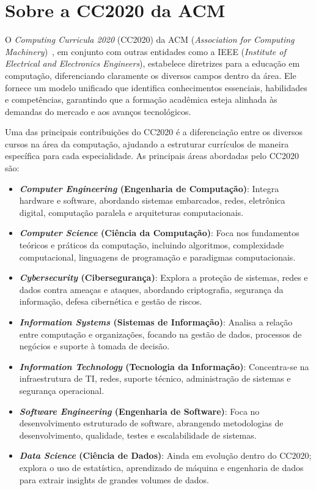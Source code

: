 \chapter{Sobre a CC2020 da ACM}
\label{chp:apresentacao_acm}

O \textit{Computing Curricula 2020} (CC2020) da ACM (\textit{Association for Computing Machinery})~\cite{ACM:CC2020}, em conjunto com outras entidades como a IEEE (\textit{Institute of Electrical and Electronics Engineers}), estabelece diretrizes para a educação em computação, diferenciando claramente os diversos campos dentro da área. Ele fornece um modelo unificado que identifica conhecimentos essenciais, habilidades e competências, garantindo que a formação acadêmica esteja alinhada às demandas do mercado e aos avanços tecnológicos.

Uma das principais contribuições do CC2020 é a diferenciação entre os diversos cursos na área da computação, ajudando a estruturar currículos de maneira específica para cada especialidade. As principais áreas abordadas pelo CC2020 são:

    \begin{itemize}
        \item \textbf{\textit{Computer Engineering} (Engenharia de Computação)}: Integra hardware e software, abordando sistemas embarcados, redes, eletrônica digital, computação paralela e arquiteturas computacionais.
        \item \textbf{\textit{Computer Science} (Ciência da Computação)}: Foca nos fundamentos teóricos e práticos da computação, incluindo algoritmos, complexidade computacional, linguagens de programação e paradigmas computacionais.
        \item \textbf{\textit{Cybersecurity} (Cibersegurança)}: Explora a proteção de sistemas, redes e dados contra ameaças e ataques, abordando criptografia, segurança da informação, defesa cibernética e gestão de riscos.
        \item \textbf{\textit{Information Systems} (Sistemas de Informação)}: Analisa a relação entre computação e organizações, focando na gestão de dados, processos de negócios e suporte à tomada de decisão.
        \item \textbf{\textit{Information Technology} (Tecnologia da Informação)}: Concentra-se na infraestrutura de TI, redes, suporte técnico, administração de sistemas e segurança operacional.
        \item \textbf{\textit{Software Engineering} (Engenharia de Software)}: Foca no desenvolvimento estruturado de software, abrangendo metodologias de desenvolvimento, qualidade, testes e escalabilidade de sistemas.
        \item \textbf{\textit{Data Science} (Ciência de Dados)}: Ainda em evolução dentro do CC2020; explora o uso de estatística, aprendizado de máquina e engenharia de dados para extrair insights de grandes volumes de dados.
    \end{itemize}

